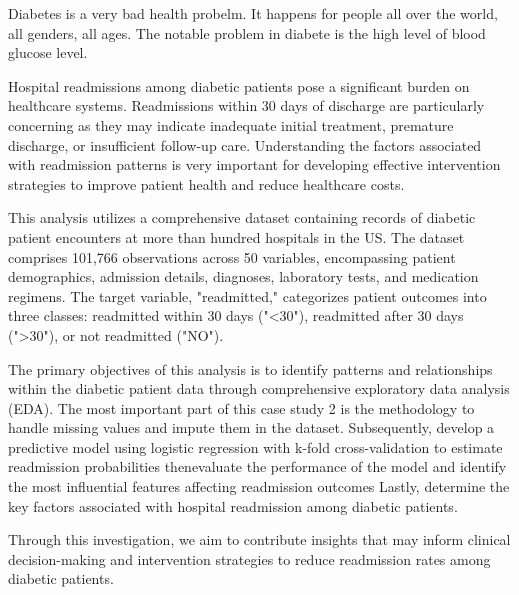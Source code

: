 Diabetes is a very bad health probelm. It happens for people all over the world, all genders, all ages.
The notable problem in diabete is the high level of blood glucose level.

Hospital readmissions among diabetic patients pose a significant burden on healthcare systems.
Readmissions within 30 days of discharge are particularly concerning as they may indicate inadequate initial treatment, premature discharge, or insufficient follow-up care. 
Understanding the factors associated with readmission patterns is very important for developing effective intervention strategies to improve patient health and reduce healthcare costs.

This analysis utilizes a comprehensive dataset containing records of diabetic patient encounters at more than hundred hospitals in the US. 
The dataset comprises 101,766 observations across 50 variables, encompassing patient demographics, admission details, diagnoses, laboratory tests, and medication regimens. 
The target variable, "readmitted," categorizes patient outcomes into three classes: readmitted within 30 days ("<30"), readmitted after 30 days (">30"), or not readmitted ("NO").

The primary objectives of this analysis is to identify patterns and relationships within the diabetic patient data through comprehensive exploratory data analysis (EDA).
The most important part of this case study 2 is the methodology to handle missing values and impute them in the dataset.
Subsequently, develop a predictive model using logistic regression with k-fold cross-validation to estimate readmission probabilities thenevaluate the performance of the model and identify the most influential features affecting readmission outcomes
Lastly, determine the key factors associated with hospital readmission among diabetic patients.

Through this investigation, we aim to contribute insights that may inform clinical decision-making and intervention strategies to reduce readmission rates among diabetic patients. 